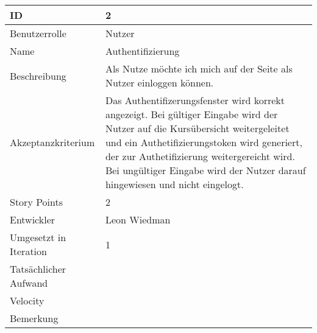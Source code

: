 \begin{tabularx}{\textwidth}{|p{}|X|}
	\hline
	ID & 2\\
	\hline
	Benutzerrolle & Nutzer\\
	\hline
	Name & Authentifizierung\\
	\hline
	Beschreibung & Als Nutze möchte ich mich auf der Seite als Nutzer einloggen können.\\
	\hline
	Akzeptanzkriterium & Das Authentifizerungsfenster wird korrekt angezeigt. Bei gültiger Eingabe wird der Nutzer auf die Kursübersicht weitergeleitet und ein Authetifizierungstoken wird generiert, der zur Authetifizierung weitergereicht wird. Bei ungültiger Eingabe wird der Nutzer darauf hingewiesen und nicht eingelogt.\\
	\hline
	Story Points & 2 \\
	\hline
	Entwickler & Leon Wiedman\\
	\hline
	Umgesetzt in Iteration & 1\\ 
	\hline
	Tatsächlicher Aufwand & \\
	\hline
	Velocity & \\
	\hline
	Bemerkung & \\
	\hline
\end{tabularx}
\vspace{20pt}
